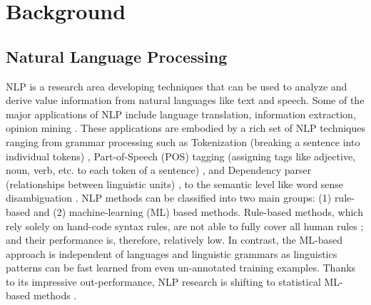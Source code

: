 \documentclass[Journal, BackFigs, DoubleSpace]{ascelike}%
\begin{document}
% 
\section{Background} \label{sec:litrev} %
%
\subsection{Natural Language Processing}
NLP is a research area developing techniques that can be used to analyze and derive value information from natural languages like text and speech. Some of the major applications of NLP include language translation, information extraction, opinion mining \cite{Cambria14}. These applications are embodied by a rich set of NLP techniques ranging from grammar processing such as Tokenization (breaking a sentence into individual tokens) \cite{Webster92,Zhao11},  Part-of-Speech (POS) tagging (assigning tags like adjective, noun, verb, etc. to each token of a sentence) \cite{Toutanova03,Cunningham02}, and Dependency parser (relationships between linguistic units) \cite{chen14}, to the semantic level like word sense disambiguation \cite{Lesk86,Yarowsky95,Navigli09}. NLP methods can be classified into two main groups: (1) rule-based and (2) machine-learning (ML) based methods. Rule-based methods, which rely solely on hand-code syntax rules, are not able to fully cover all human rules \cite{Marcus95}; and their performance is, therefore, relatively low. In contrast, the ML-based approach is independent of languages and linguistic grammars \cite{costa-jussa12} as linguistics patterns can be fast learned from even un-annotated training examples. Thanks to its impressive out-performance, NLP research is shifting to statistical ML-based methods \cite{Cambria14}. 
%
\end{document}
